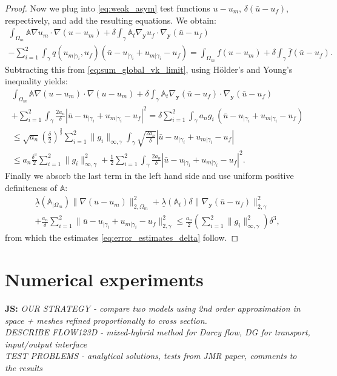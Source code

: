 \documentclass[a4paper]{article}
\def\vc#1{\mathbf{\boldsymbol{#1}}}     %
\def\tn#1{{\mathbb{#1}}}    %
\def\norm#1{\|#1\|}
\def\yy{{\vc y}}
\newcommand{\note}[2]{{\color{blue} \textbf{ #1:} \textit{#2}}}
\begin{document}
\begin{proof}
Now we plug into \eqref{eq:weak_asym} test functions $u-u_m$, $\delta(\bar u-u_f)$, respectively, and add the resulting equations.
We obtain:
\begin{multline*}
\int_{\Omega_m}\tn A\nabla u_m\cdot\nabla(u-u_m) + \delta\int_\gamma\tn A_t\nabla_\yy u_f\cdot\nabla_\yy(\bar u-u_f)\\
- \sum_{i=1}^2\int_\gamma q(u_{m|\gamma_i},u_f)(\bar u - u_{|\gamma_i}+u_{m|\gamma_i} - u_f)
= \int_{\Omega_m} f(u-u_m)
+ \delta\int_\gamma\bar f(\bar u-u_f).
\end{multline*}
Subtracting this from \eqref{eq:sum_global_vk_limit}, using H\"older's and Young's inequality yields:
\begin{multline}
\int_{\Omega_m}\tn A\nabla (u-u_m)\cdot\nabla(u-u_m)
+\delta\int_\gamma\tn A_t\nabla_\yy(\bar u-u_f)\cdot\nabla_\yy(\bar u-u_f)\\
+ \sum_{i=1}^2\int_\gamma \frac{2a_n}\delta |\bar u - u_{|\gamma_i} + u_{m|\gamma_i} - u_f|^2
= \delta\sum_{i=1}^2\int_\gamma a_n g_i\, (\bar u - u_{|\gamma_i} + u_{m|\gamma_i} - u_f)\\
\le \sqrt{a_n}\left(\frac\delta2\right)^{\frac32}\sum_{i=1}^2\norm{g_i}_{\infty,\gamma}\int_\gamma\sqrt{\frac{2a_n}\delta}|\bar u - u_{|\gamma_i} + u_{m|\gamma_i} - u_f|\\
\le a_n\frac{\delta^3}2\sum_{i=1}^2\norm{g_i}_{\infty,\gamma}^2 + \frac12\sum_{i=1}^2\int_\gamma \frac{2a_n}\delta |\bar u - u_{|\gamma_i} + u_{m|\gamma_i} - u_f|^2.
\end{multline}
Finally we absorb the last term in the left hand side and use uniform positive definiteness of $\tn A$:
\begin{multline}
\underline\lambda(\tn A_{|\Omega_m})\norm{\nabla (u-u_m)}_{2,\Omega_m}^2
+\underline\lambda(\tn A_t)\delta\norm{\nabla_\yy(\bar u-u_f)}_{2,\gamma}^2\\
+ \frac{a_n}\delta\sum_{i=1}^2\norm{\bar u - u_{|\gamma_i} + u_{m|\gamma_i} - u_f}_{2,\gamma}^2
\le \frac{a_n}2\left(\sum_{i=1}^2\norm{g_i}_{\infty,\gamma}^2\right)\delta^3,
\end{multline}
from which the estimates \eqref{eq:error_estimates_delta} follow.
\end{proof}


\section{Numerical experiments}
\label{sc:numerics}

\note{JS}{
OUR STRATEGY - compare two models using 2nd order approximation in space + meshes refined proportionally to cross section.
\\
DESCRIBE FLOW123D - mixed-hybrid method for Darcy flow, DG for transport, input/output interface
\\
TEST PROBLEMS - analytical solutions, tests from JMR paper, comments to the results
}
\end{document}
